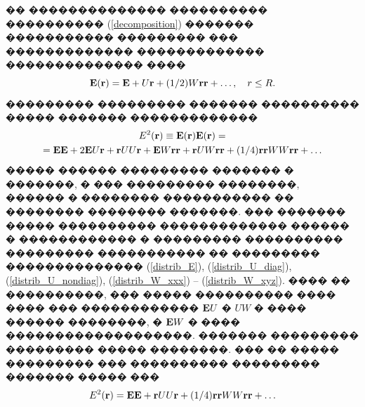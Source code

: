 \documentclass[12pt,titlepage]{article}
\begin{document}
�� �������������� ���������� ���������� (\ref{decomposition}) ������� ����������� ��������� ��� ������������� ������������� �������������� ����
\begin{equation}
    \label{local_field}
    {\bf E}( {\bf r} ) = {\bf E} + U {\bf r} + (1/2) W {\bf r} {\bf r} + \ldots, \quad r \leq R.
\end{equation}
��������� ��������� ������� ���������� ����� ������� �������������
\begin{gather}
    E^2( {\bf r} ) \equiv {\bf E}( {\bf r} ) {\bf E}( {\bf r} ) = \notag \\
    = {\bf E}{\bf E} + 2 {\bf E} U {\bf r} + {\bf r} U U {\bf r}
    + {\bf E} W{\bf r}{\bf r} + {\bf r} U W {\bf r}{\bf r} + (1/4) {\bf r}{\bf r} WW {\bf r}{\bf r} + \ldots
\end{gather}
����� ������ ��������� ������� � �������, � ��� ��������� ��������, ������ � �������� ����������� �� �������� �������� �������. ��� ������� ����� ���������� ������������� ������ � ������������ � ��������� ���������� ��������� ����������� �� ��������� �������������� (\ref{distrib_E}), (\ref{distrib_U_diag}), (\ref{distrib_U_nondiag}), (\ref{distrib_W_xxx}) -- (\ref{distrib_W_xyz}). ���� �� ����������, ��� ����� ���������� ���� ���� ��� ������������ ${\bf E} U$ � $U W$ � ���� ������ ��������, � ${\bf E} W$ � ���� �������������������. ������� ��������� ��������� ����� ��������. ��� �� ����� ��������� ��� ���������� ��������� ������� ����� ���
\begin{gather}
    \label{energy_noncorr}
    E^2( {\bf r} ) = {\bf E}{\bf E} + {\bf r} U U {\bf r} + (1/4) {\bf r}{\bf r} WW {\bf r}{\bf r} + \ldots
\end{gather}
\end{document}
